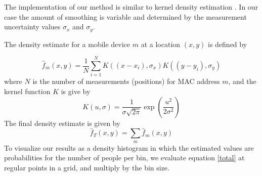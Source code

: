 \documentclass[10pt,a4paper]{article}
\begin{document}
The implementation of our method is similar to kernel density estimation \cite{scott}\cite{silverman}.
In our case the amount of smoothing is variable and determined by the measurement uncertainty values $\sigma_{x}$ and $\sigma_{y}$.

The density estimate for a mobile device $m$ at a location $(x,y)$ is defined by

\begin{equation}
\hat{f}_{m}(x,y)=\frac{1}{N}\sum_{i=1}^{N}K((x-x_{i}),\sigma_{x}) K((y-y_{i}),\sigma_{y})
\label{kde}
\end{equation}
where $N$ is the number of measurements (positions) for MAC address $m$, and the kernel function $K$ is give by
\begin{equation}
K(u,\sigma)=\frac{1}{\sigma\sqrt{2\pi}}\exp(\frac{u^2}{2\sigma^2})
\end{equation}
The final density estimate is given by
\begin{equation}
\hat{f}_{T}(x,y)=\sum_{m}\hat{f}_{m}(x,y)
\label{total}
\end{equation}
To visualize our results as a density histogram in which the estimated values are probabilities for the number of people per bin, we evaluate equation \ref{total} at regular points in a grid, and multiply by the bin size.

\end{document}

